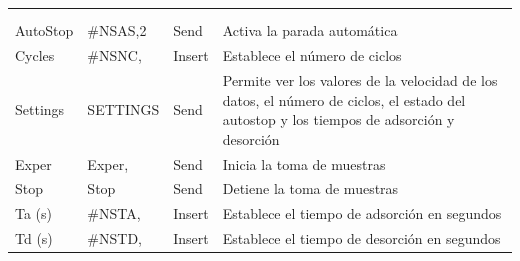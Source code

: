 \footnotesize
\setlength{\tabcolsep}{4pt}
\begin{xltabular}{\textwidth}{@{} >{\centering\arraybackslash}p{0.22\textwidth} >{\centering\arraybackslash}p{0.22\textwidth} >{\centering\arraybackslash}p{0.22\textwidth} >{\raggedright\arraybackslash}p{0.34\textwidth} @{}}
        \toprule
     &  &  &  \\
\midrule
\endfirsthead%

        \toprule
     &  &  &  \\
\midrule
\endhead%

\midrule {}\\
\endfoot%

\bottomrule
\endlastfoot%
    AutoStop & \#NSAS,2 & Send & Activa la parada automática \\
    \midrule
    Cycles & \#NSNC, & Insert & Establece el número de ciclos \\
    \midrule
    Settings & SETTINGS & Send & Permite ver los valores de la velocidad de los datos, el número de ciclos, el estado del autostop y los tiempos de adsorción y desorción \\
    \midrule
    Exper & Exper, & Send & Inicia la toma de muestras \\
    \midrule
    Stop & Stop & Send & Detiene la toma de muestras \\
    \midrule
    Ta (s) & \#NSTA, & Insert & Establece el tiempo de adsorción en segundos \\
    \midrule
    Td (s) & \#NSTD, & Insert & Establece el tiempo de desorción en segundos \\
\end{xltabular}
\normalsize
{\captionsetup{type=table,hypcap=false}\label{tab:botones_macros}}